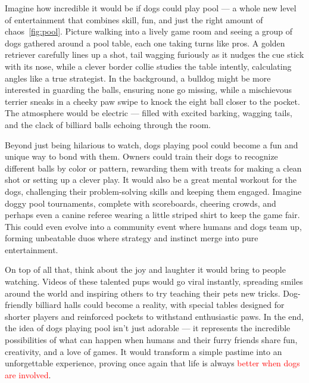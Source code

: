 \documentclass[11pt,a4paper]{report}
\begin{document}
Imagine how incredible it would be if dogs could play pool — a whole new level of entertainment that combines skill, fun, and just the right amount of chaos~\ref{fig:pool}. Picture walking into a lively game room and seeing a group of dogs gathered around a pool table, each one taking turns like pros. A golden retriever carefully lines up a shot, tail wagging furiously as it nudges the cue stick with its nose, while a clever border collie studies the table intently, calculating angles like a true strategist. In the background, a bulldog might be more interested in guarding the balls, ensuring none go missing, while a mischievous terrier sneaks in a cheeky paw swipe to knock the eight ball closer to the pocket. The atmosphere would be electric — filled with excited barking, wagging tails, and the clack of billiard balls echoing through the room.

Beyond just being hilarious to watch, dogs playing pool could become a fun and unique way to bond with them. Owners could train their dogs to recognize different balls by color or pattern, rewarding them with treats for making a clean shot or setting up a clever play. It would also be a great mental workout for the dogs, challenging their problem-solving skills and keeping them engaged. Imagine doggy pool tournaments, complete with scoreboards, cheering crowds, and perhaps even a canine referee wearing a little striped shirt to keep the game fair. This could even evolve into a community event where humans and dogs team up, forming unbeatable duos where strategy and instinct merge into pure entertainment.

On top of all that, think about the joy and laughter it would bring to people watching. Videos of these talented pups would go viral instantly, spreading smiles around the world and inspiring others to try teaching their pets new tricks. Dog-friendly billiard halls could become a reality, with special tables designed for shorter players and reinforced pockets to withstand enthusiastic paws. In the end, the idea of dogs playing pool isn’t just adorable — it represents the incredible possibilities of what can happen when humans and their furry friends share fun, creativity, and a love of games. It would transform a simple pastime into an unforgettable experience, proving once again that life is always \textcolor{red}{better when dogs are involved}.


  
\end{document}
